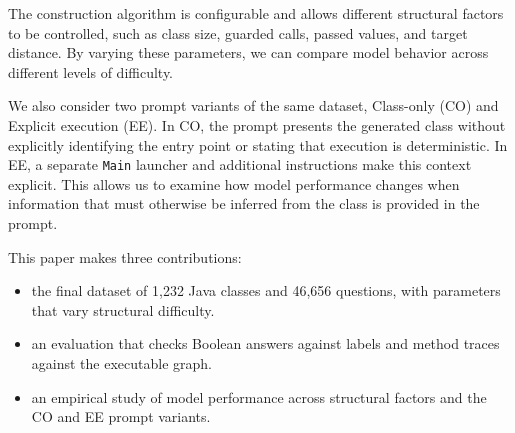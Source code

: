 The construction algorithm is configurable and allows different structural factors to be controlled, such as class size, guarded calls, passed values, and target distance. By varying these parameters, we can compare model behavior across different levels of difficulty.

We also consider two prompt variants of the same dataset, Class-only (CO) and Explicit execution (EE). In CO, the prompt presents the generated class without explicitly identifying the entry point or stating that execution is deterministic. In EE, a separate \texttt{Main} launcher and additional instructions make this context explicit. This allows us to examine how model performance changes when information that must otherwise be inferred from the class is provided in the prompt.

This paper makes three contributions:
\begin{itemize}[leftmargin=*]
    \item the final \benchmark dataset of 1,232 Java classes and 46,656 questions, with parameters that vary structural difficulty.
    \item an evaluation that checks Boolean answers against labels and method traces against the executable graph.
    \item an empirical study of model performance across structural factors and the CO and EE prompt variants.
\end{itemize}

